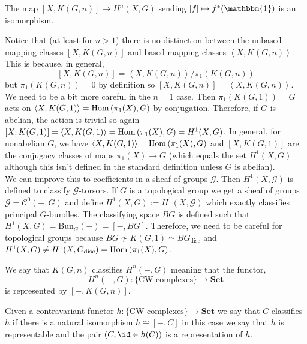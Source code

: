 \documentclass[12pt]{extarticle}
\begin{document}
\begin{theorem}
The map $[X, K(G, n)] \to H^n(X, G)$ sending $[f] \mapsto f^*(\mathbbm{1})$ is an isomorphism. 
\end{theorem}

\begin{rmk}
Notice that (at least for $n > 1$) there is no distinction between the unbased mapping classes $[X, K(G, n)]$ and based mapping classes $\left<X, K(G, n) \right>$. This is because, in general,
\[ [X, K(G, n)] = \left< X, K(G, n) \right> / \pi_1(K(G, n)) \]
but $\pi_1(K(G, n)) = 0$ by definition so $[X, K(G, n)] = \left< X, K(G, n) \right>$. We need to be a bit more careful in the $n = 1$ case. Then $\pi_1(K(G,1)) = G$ acts on $\left< X, K(G, 1) \right> = \mathrm{Hom}\left( \pi_1(X), G \right)$ by conjugation. Therefore, if $G$ is abelian, the action is trivial so again $[X, K(G, 1)] = \left< X, K(G, 1) \right> = \mathrm{Hom}\left( \pi_1(X), G \right) = H^1(X, G)$. In general, for nonabelian $G$, we have $\left< X, K(G, 1) \right> = \mathrm{Hom}\left( \pi_1(X), G \right)$ and $[X, K(G, 1)]$ are the conjugacy classes of maps $\pi_1(X) \to G$ (which equals the set $H^1(X, G)$ although this isn't defined in the standard definition unless $G$ is abelian).
\bigskip\\
We can improve this to coefficients in a sheaf of groups $\mathcal{G}$. Then $H^1(X, \mathcal{G})$ is defined to classify $\mathcal{G}$-torsors. If $G$ is a topological group we get a sheaf of groups $\mathcal{G} = \mathcal{C}^0(-,G)$ and define $H^1(X, G) := H^1(X, \mathcal{G})$ which exactly classifies principal $G$-bundles. The classifying space $BG$ is defined such that $H^1(X, G) = \mathrm{Bun}_G(-) = [-, BG]$. Therefore, we need to be careful for topological groups because $BG \not\simeq K(G,1) \simeq B G_{\text{disc}}$ and $H^1(X, G) \neq H^1(X, G_{\text{disc}}) = \mathrm{Hom}\left( \pi_1(X), G \right)$.
\end{rmk}

\begin{remark}
We say that $K(G, n)$ classifies $H^n(-,G)$ meaning that the functor,
\[ H^n(-,G) : \{ \text{CW-complexes} \} \to \mathbf{Set} \]
 is represented by $[-, K(G,n)]$.
\end{remark}

\begin{definition}
Given a contravariant functor $h : \{ \text{CW-complexes} \} \to \mathbf{Set}$ we say that $C$ classifies $h$ if there is a natural isomorphism $h \cong [-, C]$ in this case we say that $h$ is representable and the pair $(C, \id \in h(C))$ is a representation of $h$. 
\end{definition}
\end{document}
